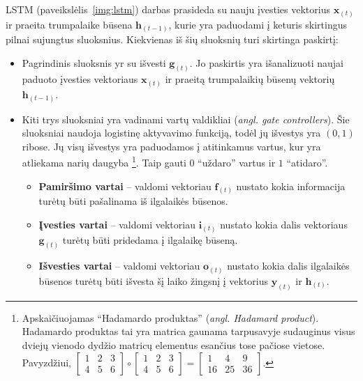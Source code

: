 \documentclass{VUMIFPSbakalaurinis}
\begin{document}
{	LSTM (paveikslėlis~\ref{img:lstm}) darbas prasideda su nauju įvesties vektorius \(\mathbf{x}_{(t)}\) ir praeita trumpalaike būsena \(\mathbf{h}_{(t-1)}\), kurie yra paduodami į keturis skirtingus pilnai sujungtus sluoksnius. Kiekvienas iš šių sluoksnių turi skirtinga paskirtį:
	
	\begin{itemize}
		\item Pagrindinis sluoksnis yr su išvesti \(\mathbf{g}_{(t)}\). Jo paskirtis yra išanalizuoti naujai paduoto įvesties vektoriaus \(\mathbf{x}_{(t)}\) ir praeitą trumpalaikių būsenų vektorių \(\mathbf{h}_{(t-1)}\).
		\item Kiti trys sluoksniai yra vadinami vartų valdikliai (\textit{angl. gate controllers}). Šie sluoksniai naudoja logistinę aktyvavimo funkciją, todėl jų išvestys yra \((0, 1)\) ribose. Jų visų išvestys yra paduodamos į atitinkamus vartus, kur yra atliekama narių daugyba
		\footnote{Apskaičiuojamas \enquote{Hadamardo produktas} (\textit{angl. Hadamard product}). Hadamardo produktas tai yra matrica gaunama tarpusavyje sudauginus visus dviejų vienodo dydžio matricų elementus esančius tose pačiose vietose. Pavyzdžiui, 
			\(\begin{bmatrix} 1 & 2 & 3 \\ 4 & 5 & 6 \end{bmatrix} \circ
			\begin{bmatrix} 1 & 2 & 3 \\ 4 & 5 & 6 \end{bmatrix} =			
			\begin{bmatrix} 1 & 4 & 9 \\ 16 & 25 & 36 \end{bmatrix}\).
		}. Taip gauti \(0\) \enquote{uždaro} vartus ir \(1\) \enquote{atidaro}.
		\begin{itemize}
			\item \textbf{Pamiršimo vartai} -- valdomi vektoriau \(\mathbf{f}_{(t)}\) nustato kokia informacija turėtų būti pašalinama iš ilgalaikės būsenos.
			\item \textbf{Įvesties vartai} -- valdomi vektoriau \(\mathbf{i}_{(t)}\) nustato kokia dalis vektoriaus \(\mathbf{g}_{(t)}\) turėtų būti pridedama į ilgalaikę būseną.
			\item \textbf{Išvesties vartai} -- valdomi vektoriau \(\mathbf{o}_{(t)}\) nustato kokia dalis ilgalaikės būsenos turėtų būti išvesta šį laiko žingsnį į vektorius \(\mathbf{y}_{(t)}\) ir \(\mathbf{h}_{(t)}\).
		\end{itemize}
	\end{itemize}
}
\end{document}
